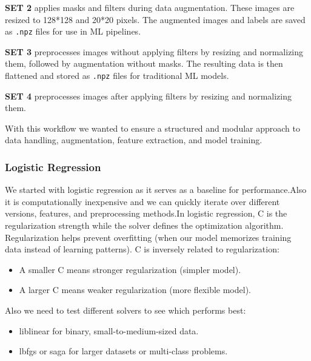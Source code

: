 \documentclass{article}
\begin{document}
\textbf{SET 2} applies masks and filters during data augmentation. These images are resized to 128*128 and 20*20 pixels. The augmented images and labels are saved as \texttt{.npz} files for use in ML pipelines.

\textbf{SET 3 } preprocesses images without applying filters by resizing and normalizing them, followed by augmentation without masks. The resulting data is then flattened and stored as \texttt{.npz} files for traditional ML models.

\textbf{SET 4 }preprocesses images after applying filters by resizing and normalizing them.

With this workflow we wanted to ensure a structured and modular approach to data handling, augmentation, feature extraction, and model training.
\\

\subsubsection{Logistic Regression}
We started with logistic regression as it serves as a baseline for performance.Also it is computationally inexpensive and we can quickly iterate over different versions, features, and preprocessing methods.In logistic regression, C is the regularization strength while the solver defines the optimization algorithm.	Regularization helps prevent overfitting (when our model memorizes training data instead of learning patterns).
C is inversely related to regularization:
\begin{itemize}
    \item A smaller C means stronger regularization (simpler model).
    \item A larger C means weaker regularization (more flexible model).
\end{itemize}
Also we need to test different solvers to see which performs best:
\begin{itemize}
    \item liblinear for binary, small-to-medium-sized data.
    \item lbfgs or saga for larger datasets or multi-class problems.
\end{itemize}
\end{document}
